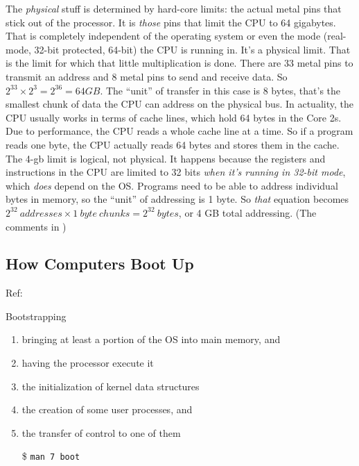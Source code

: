 The \emph{physical} stuff is determined by hard-core limits: the actual metal pins that
stick out of the processor. It is \emph{those} pins that limit the CPU to 64
gigabytes. That is completely independent of the operating system or even the mode
(real-mode, 32-bit protected, 64-bit) the CPU is running in. It's a physical limit. That
is the limit for which that little multiplication is done. There are 33 metal pins to
transmit an address and 8 metal pins to send and receive data. So
$2^{33}\times{} 2^3 = 2^{36} = 64 GB$.  The “unit” of transfer in this case is 8 bytes,
that's the smallest chunk of data the CPU can address on the physical bus. In actuality,
the CPU usually works in terms of cache lines, which hold 64 bytes in the Core 2s. Due to
performance, the CPU reads a whole cache line at a time. So if a program reads one byte,
the CPU actually reads 64 bytes and stores them in the cache.  The 4-gb limit is logical,
not physical. It happens because the registers and instructions in the CPU are limited to
32 bits \emph{when it's running in 32-bit mode}, which \emph{does} depend on the
OS. Programs need to be able to address individual bytes in memory, so the “unit” of
addressing is 1 byte. So \emph{that} equation becomes
$2^{32}\ addresses \times{} 1\ byte\ chunks = 2^{32}\ bytes$, or 4 GB total
addressing. (The comments in )

\subsection{How Computers Boot Up}

Ref: 

\begin{frame}{Bootstrapping}
  \begin{center}
  \end{center}
  \begin{enumerate}
  \item bringing at least a portion of the OS into main memory, and
  \item having the processor execute it
  \item the initialization of kernel data structures
  \item the creation of some user processes, and
  \item the transfer of control to one of them
  \item[\$] \texttt{man 7 boot}
  \end{enumerate}
\end{frame}

